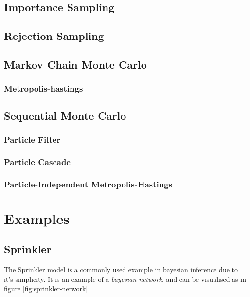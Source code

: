 \subsection{Importance Sampling} \label{sec:imp}
\subsection{Rejection Sampling} \label{sec:rej}
\subsection{Markov Chain Monte Carlo} \label{sec:mcmc}
\subsubsection{Metropolis-hastings} \label{sec:mh}
\subsection{Sequential Monte Carlo} \label{sec:smc}
\subsubsection{Particle Filter} \label{sec:pf}
\subsubsection{Particle Cascade} \label{sec:pc}
\subsubsection{Particle-Independent Metropolis-Hastings} \label{sec:pimh}

\section{Examples}

\subsection{Sprinkler}
The Sprinkler model is a commonly used example in bayesian inference due to it's simplicity. It is an example of a \textit{bayesian network}, and can be visualised as in figure \ref{fig:sprinkler-network}


